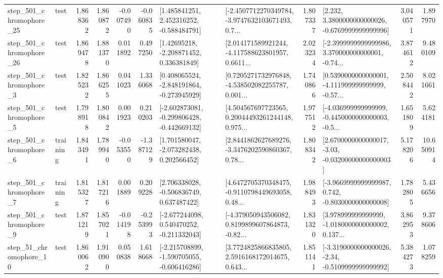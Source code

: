 \begin{tabular}{llrrrrllrlrr}
  step\_501\_chromophore\_25 &      test &      1.868362 &    1.860872 &     -0.007490 & -0.060835 &    [1.485841251, 2.452316252, -0.588484791] &  [-2.4507712270349784, -3.9747632103671493, 0.7... &       1.807337 &   [2.232, 3.3800000000000026, -0.6769999999999996] &            3.040571 &          1.897970 \\
  step\_501\_chromophore\_26 &      test &      1.869478 &    1.881370 &      0.011892 &  0.497250 &     [1.42695218, -2.208871452, 0.336381849] &  [2.014171589921244, -4.117588623801957, 0.6611... &       2.023234 &  [-2.3999999999999986, 3.370000000000001, -0.74... &            3.874612 &          9.480109 \\
   step\_501\_chromophore\_3 &      test &      1.825232 &    1.866255 &      0.041023 &  1.336068 &   [0.408065524, -2.848191864, -0.273945929] &  [0.7205271732976848, -4.538502082255787, 0.001... &       1.740866 &  [0.5390000000000001, -4.111999999999999, -0.57... &            2.508442 &          8.021661 \\
   step\_501\_chromophore\_5 &      test &      1.798918 &    1.800842 &      0.001923 &  0.210203 &  [-2.602873081, -0.299806428, -0.442669132] &  [4.504567697723565, 0.20044493261244148, 0.975... &       1.977512 &  [-4.036999999999999, -0.4450000000000003, -0.5... &            1.651809 &          5.624181 \\
   step\_501\_chromophore\_6 &  training &      1.843491 &    1.789940 &     -0.053550 & -1.387129 &    [1.701580047, -2.073282438, 0.202566452] &  [2.8441862627689276, -3.3476202590860367, 0.78... &       1.808342 &  [2.6700000000000017, -3.03, -0.03200000000000003] &            5.178206 &         10.650914 \\
   step\_501\_chromophore\_7 &  training &      1.815327 &    1.817216 &      0.001889 &  0.209228 &    [2.706338028, -0.506836749, 0.637487422] &  [4.6472705370348475, -0.9110798449693058, 0.48... &       1.988493 &  [-3.9669999999999987, 0.742, -0.8030000000000008] &            1.782805 &          5.436656 \\
   step\_501\_chromophore\_9 &      test &      1.871219 &    1.857021 &     -0.014198 & -0.253993 &   [-2.677244098, 0.540470252, -0.211332043] &  [-4.379050943506082, 0.8199899607864873, -0.82... &       1.831320 &  [3.978999999999999, -1.0180000000000002, 0.137... &            3.862953 &          9.378606 \\
   step\_51\_chromophore\_10 &      test &      1.860062 &    1.910900 &      0.050838 &  1.618668 &  [-2.215708899, -1.590705055, -0.606416286] &  [3.7724825866835805, 2.5916168172014675, 0.643... &       1.851141 &  [-3.3190000000000026, -2.34, -0.5109999999999992] &            5.384273 &          1.078259 \\

\end{tabular}
